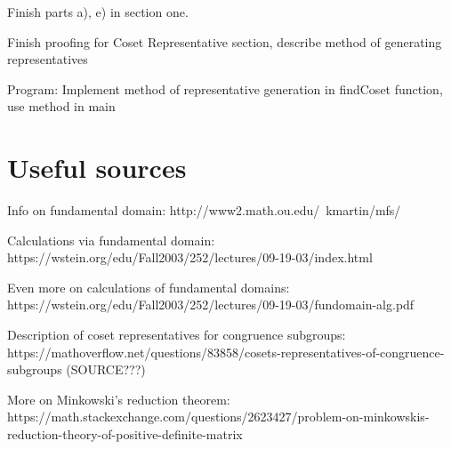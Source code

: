 \documentclass[11pt, oneside]{article}   	%
\begin{document}
Finish parts a), e) in section one.

Finish proofing for Coset Representative section, describe method of generating representatives

Program: Implement method of representative generation in findCoset function, use method in main

\section*{Useful sources}

Info on fundamental domain: http://www2.math.ou.edu/~kmartin/mfs/

Calculations via fundamental domain: https://wstein.org/edu/Fall2003/252/lectures/09-19-03/index.html

Even more on calculations of fundamental domains: https://wstein.org/edu/Fall2003/252/lectures/09-19-03/fundomain-alg.pdf

Description of coset representatives for congruence subgroups: https://mathoverflow.net/questions/83858/cosets-representatives-of-congruence-subgroups (SOURCE???)

More on Minkowski's reduction theorem: https://math.stackexchange.com/questions/2623427/problem-on-minkowskis-reduction-theory-of-positive-definite-matrix
\end{document}
